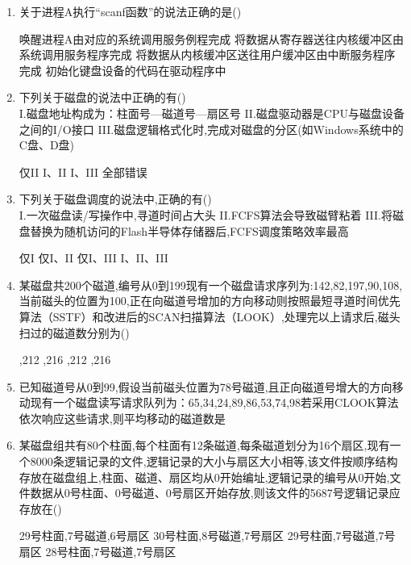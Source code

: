 \documentclass[12pt, a4paper, oneside, UTF8]{ctexbook}
\begin{document}
\begin{enumerate}
    \item 关于进程A执行“scanf函数”的说法正确的是(\qquad)
    \begin{choices}[1]
    \task 唤醒进程A由对应的系统调用服务例程完成
    \task 将数据从寄存器送往内核缓冲区由系统调用服务程序完成
    \task 将数据从内核缓冲区送往用户缓冲区由中断服务程序完成
    \task 初始化键盘设备的代码在驱动程序中
    \end{choices}

    \item 下列关于磁盘的说法中正确的有(\qquad)\\
    I.磁盘地址构成为：柱面号—磁道号—扇区号\quad
    II.磁盘驱动器是CPU与磁盘设备之间的I/O接口\quad
    III.磁盘逻辑格式化时,完成对磁盘的分区(如Windows系统中的C盘、D盘)
    \begin{choices}[2]
    \task 仅II
    \task I、II
    \task I、III
    \task 全部错误
    \end{choices}

    \item 下列关于磁盘调度的说法中,正确的有(\qquad)\\
    I.一次磁盘读/写操作中,寻道时间占大头\quad
    II.FCFS算法会导致磁臂粘着\quad
    III.将磁盘替换为随机访问的Flash半导体存储器后,FCFS调度策略效率最高
    \begin{choices}[2]
    \task 仅I
    \task 仅I、II
    \task 仅I、III
    \task I、II、III
    \end{choices}

    \item 某磁盘共200个磁道,编号从0到199现有一个磁盘请求序列为:142,82,197,90,108,当前磁头的位置为100,正在向磁道号增加的方向移动则按照最短寻道时间优先算法（SSTF）和改进后的SCAN扫描算法（LOOK）,处理完以上请求后,磁头扫过的磁道数分别为(\qquad)
    \begin{choices}
    ,212
    ,216
    ,212
    ,216
    \end{choices}

    \item 已知磁道号从0到99,假设当前磁头位置为78号磁道,且正向磁道号增大的方向移动现有一个磁盘读写请求队列为：65,34,24,89,86,53,74,98若采用CLOOK算法依次响应这些请求,则平均移动的磁道数是
    \begin{choices}
    \end{choices}

    \item 某磁盘组共有80个柱面,每个柱面有12条磁道,每条磁道划分为16个扇区,现有一个8000条逻辑记录的文件,逻辑记录的大小与扇区大小相等,该文件按顺序结构存放在磁盘组上,柱面、磁道、扇区均从0开始编址,逻辑记录的编号从0开始,文件数据从0号柱面、0号磁道、0号扇区开始存放,则该文件的5687号逻辑记录应存放在(\qquad)
    \begin{choices}
    \task 29号柱面,7号磁道,6号扇区
    \task 30号柱面,8号磁道,7号扇区
    \task 29号柱面,7号磁道,7号扇区
    \task 28号柱面,7号磁道,7号扇区
    \end{choices}


\end{enumerate}
\end{document}
